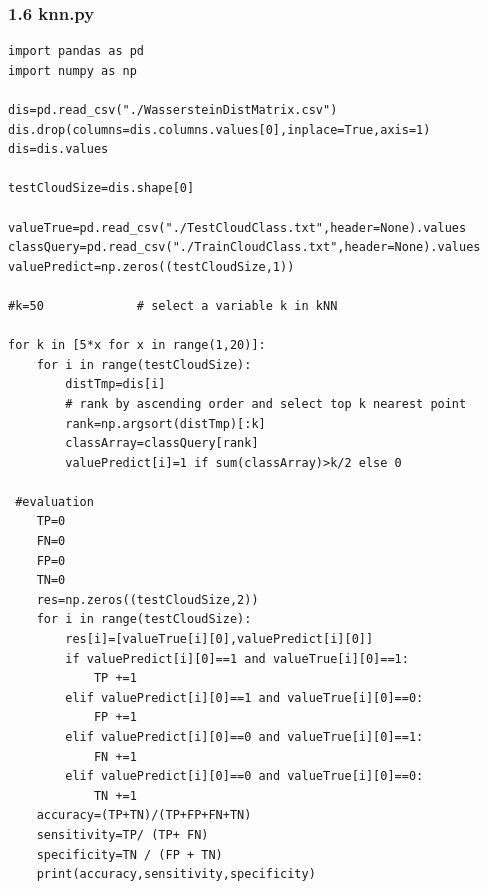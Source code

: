 \documentclass[12pt]{ctexart}
\begin{document}
\subsubsection*{1.6 knn.py}
\begin{scriptsize}
\begin{verbatim}
import pandas as pd
import numpy as np

dis=pd.read_csv("./WassersteinDistMatrix.csv")
dis.drop(columns=dis.columns.values[0],inplace=True,axis=1)
dis=dis.values

testCloudSize=dis.shape[0]

valueTrue=pd.read_csv("./TestCloudClass.txt",header=None).values
classQuery=pd.read_csv("./TrainCloudClass.txt",header=None).values
valuePredict=np.zeros((testCloudSize,1))

#k=50             # select a variable k in kNN

for k in [5*x for x in range(1,20)]:
    for i in range(testCloudSize):
        distTmp=dis[i]
        # rank by ascending order and select top k nearest point
        rank=np.argsort(distTmp)[:k]
        classArray=classQuery[rank]
        valuePredict[i]=1 if sum(classArray)>k/2 else 0

 #evaluation
    TP=0
    FN=0
    FP=0
    TN=0
    res=np.zeros((testCloudSize,2))
    for i in range(testCloudSize):
        res[i]=[valueTrue[i][0],valuePredict[i][0]]
        if valuePredict[i][0]==1 and valueTrue[i][0]==1:
            TP +=1
        elif valuePredict[i][0]==1 and valueTrue[i][0]==0:
            FP +=1
        elif valuePredict[i][0]==0 and valueTrue[i][0]==1:
            FN +=1
        elif valuePredict[i][0]==0 and valueTrue[i][0]==0:
            TN +=1
    accuracy=(TP+TN)/(TP+FP+FN+TN)
    sensitivity=TP/ (TP+ FN)
    specificity=TN / (FP + TN)
    print(accuracy,sensitivity,specificity)

\end{verbatim}
\end{scriptsize}
\end{document}
